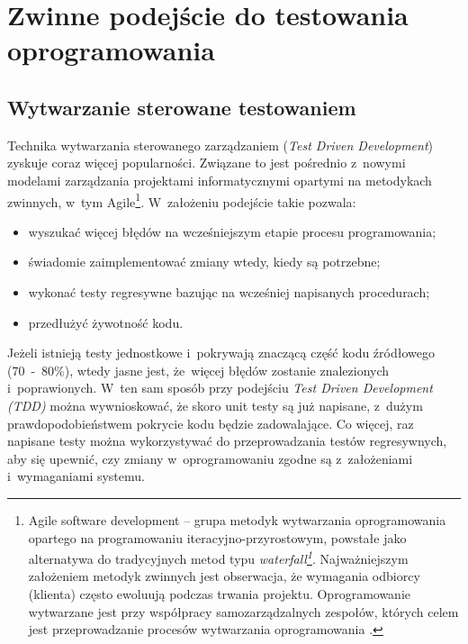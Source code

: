 \section{Zwinne podejście do testowania oprogramowania}
\label{zwinne_testowanie}
\subsection{Wytwarzanie sterowane testowaniem}
\label{test_driven_development}
Technika wytwarzania sterowanego zarządzaniem (\textit{Test Driven Development}) zyskuje coraz więcej popularności. Związane to jest pośrednio z~nowymi modelami zarządzania projektami informatycznymi opartymi na metodykach zwinnych, w~tym Agile\footnote{Agile software development – grupa metodyk wytwarzania oprogramowania opartego na programowaniu iteracyjno-przyrostowym, powstałe jako alternatywa do tradycyjnych metod typu \textit{waterfall\footnote{Iteracyjny model kaskadowy (ang. waterfall model) – jeden z~kilku rodzajów procesów tworzenia oprogramowania zdefiniowany w~inżynierii oprogramowania. Polega on na wykonywaniu podstawowych czynności jako odrębnych faz projektowych, w~porządku jeden po drugim. Każda czynność to kolejny schodek (kaskada). Jeśli któraś z~faz zwróci niesatysfakcjonujący produkt, należy się cofnąć wykonując kolejne iteracje aż do momentu kiedy otrzymano satysfakcjonujący produkt na końcu schodków \cite{website:wikipedia}.}}. Najważniejszym założeniem metodyk zwinnych jest obserwacja, że wymagania odbiorcy (klienta) często ewoluują podczas trwania projektu. Oprogramowanie wytwarzane jest przy współpracy samozarządzalnych zespołów, których celem jest przeprowadzanie procesów wytwarzania oprogramowania \cite{website:wikipedia}.}. W~założeniu podejście takie pozwala:

\begin{itemize}
\item wyszukać więcej błędów na wcześniejszym etapie procesu programowania;
\item świadomie zaimplementować zmiany wtedy, kiedy są potrzebne;
\item wykonać testy regresywne bazując na wcześniej napisanych procedurach;
\item przedłużyć żywotność kodu.
\end{itemize}

Jeżeli istnieją testy jednostkowe i~pokrywają znaczącą część kodu źródłowego (70~-~80\%), wtedy jasne jest, że~więcej błędów zostanie znalezionych i~poprawionych. W~ten sam sposób przy podejściu \textit{Test Driven Development (TDD)} można wywnioskować, że skoro unit testy są już napisane, z~dużym prawdopodobieństwem pokrycie kodu będzie zadowalające. Co więcej, raz napisane testy można wykorzystywać do przeprowadzania testów regresywnych, aby się upewnić, czy zmiany w~oprogramowaniu zgodne są z~założeniami i~wymaganiami systemu.

